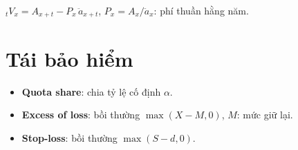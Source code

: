 \documentclass[12pt,a4paper]{article}
\begin{document}
\begin{dinhnghia}[title={Dự phòng toán học}]
  $_tV_x = A_{x+t} - P_x\,\ddot{a}_{x+t}$, $P_x = A_x/\ddot{a}_x$: phí thuần hằng năm.
\end{dinhnghia}

\section{Tái bảo hiểm}

\begin{dinhnghia}[title={Các hình thức}]
  \begin{itemize}
    \item \textbf{Quota share}: chia tỷ lệ cố định $\alpha$.
    \item \textbf{Excess of loss}: bồi thường $\max(X - M, 0)$, $M$: mức giữ lại.
    \item \textbf{Stop-loss}: bồi thường $\max(S - d, 0)$.
  \end{itemize}
\end{dinhnghia}
\end{document}
